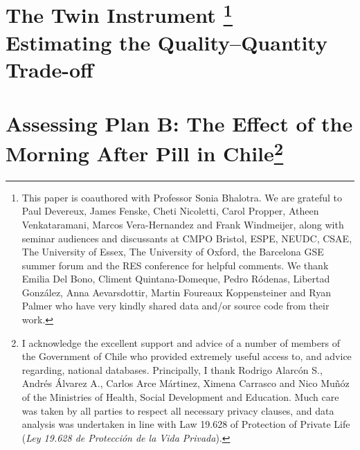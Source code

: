 \documentclass{report}[12pt]
\let\stdsection\thesection
\let\oldchapter\chapter
\renewcommand{\chapter}{\let\thesection\stdsection\oldchapter}
\newcommand{\twinloc}{./twins}
\begin{document}
\newpage
\begin{spacing}{1.4}
\setlength\parindent{0.25in}
\setlength\parskip{0.25in}




\renewcommand*{\thefootnote}{\fnsymbol{footnote}}

\chapter[The Twin Instrument and Family Size]%
{The Twin Instrument%
\footnote{This paper is coauthored with Professor Sonia Bhalotra. We are 
grateful to Paul Devereux, James Fenske, Cheti Nicoletti, Carol Propper, Atheen 
Venkataramani, Marcos Vera-Hernandez and Frank Windmeijer, along with seminar 
audiences and discussants at CMPO Bristol, ESPE, NEUDC, CSAE, The University of 
Essex, The University of Oxford, the Barcelona GSE summer forum and the RES 
conference for helpful comments.  We thank Emilia Del Bono, Climent 
Quintana-Domeque, Pedro R\'odenas, Libertad Gonz\'alez, Anna Aevarsdottir, 
Martin Foureaux Koppensteiner and Ryan Palmer who have very kindly shared data 
and/or source code from their work.} 
\\[2ex]\Large Estimating the Quality--Quantity Trade-off}
\label{chap:twins}
\renewcommand*{\thefootnote}{\arabic{footnote}}




\setlength\parindent{0.25in}
\setlength\parskip{0.25in}
\renewcommand*{\thefootnote}{\fnsymbol{footnote}}

\chapter[Assessing Plan B: The Effect of the Morning After Pill in Chile]{Assessing Plan B: The Effect of the Morning After Pill in Chile\footnote{I acknowledge
the excellent support and advice of a number of members of the Government of Chile 
who provided extremely useful access to, and advice regarding, national databases.  
Principally, I thank Rodrigo Alarc\'on S., Andr\'es \'Alvarez A., Carlos Arce 
M\'artinez, Ximena Carrasco and Nico Mu\~n\'oz of the Ministries of Health, Social 
Development and Education.  Much care was taken by all parties to respect all 
necessary privacy clauses, and data analysis was undertaken in line with Law 
19.628 of Protection of Private Life 
(\emph{Ley 19.628 de Protecci\'on de la Vida Privada}).}}
\label{chap:pill}
\renewcommand*{\thefootnote}{\arabic{footnote}}


\end{spacing}
\end{document}
